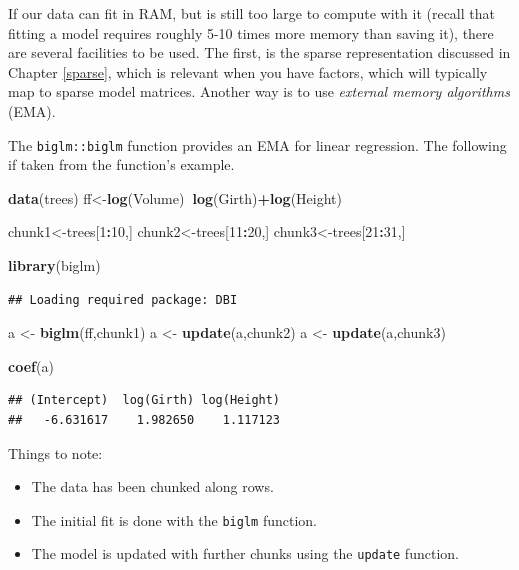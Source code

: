 \documentclass[]{book}
\newenvironment{Shaded}{\begin{snugshade}}{\end{snugshade}}
\newcommand{\DecValTok}[1]{\textcolor[rgb]{0.00,0.00,0.81}{#1}}
\newcommand{\KeywordTok}[1]{\textcolor[rgb]{0.13,0.29,0.53}{\textbf{#1}}}
\newcommand{\NormalTok}[1]{#1}
\newcommand{\OperatorTok}[1]{\textcolor[rgb]{0.81,0.36,0.00}{\textbf{#1}}}
\newcommand{\StringTok}[1]{\textcolor[rgb]{0.31,0.60,0.02}{#1}}
\providecommand{\tightlist}{%
  \setlength{\itemsep}{0pt}\setlength{\parskip}{0pt}}
\theoremstyle{definition}
\theoremstyle{definition}
\theoremstyle{definition}
\theoremstyle{remark}
\begin{document}
If our data can fit in RAM, but is still too large to compute with it (recall that fitting a model requires roughly 5-10 times more memory than saving it), there are several facilities to be used.
The first, is the sparse representation discussed in Chapter \ref{sparse}, which is relevant when you have factors, which will typically map to sparse model matrices.
Another way is to use \emph{external memory algorithms} (EMA).

The \texttt{biglm::biglm} function provides an EMA for linear regression.
The following if taken from the function's example.

\begin{Shaded}
\begin{Highlighting}[]
\KeywordTok{data}\NormalTok{(trees)}
\NormalTok{ff<-}\KeywordTok{log}\NormalTok{(Volume)}\OperatorTok{~}\KeywordTok{log}\NormalTok{(Girth)}\OperatorTok{+}\KeywordTok{log}\NormalTok{(Height)}

\NormalTok{chunk1<-trees[}\DecValTok{1}\OperatorTok{:}\DecValTok{10}\NormalTok{,]}
\NormalTok{chunk2<-trees[}\DecValTok{11}\OperatorTok{:}\DecValTok{20}\NormalTok{,]}
\NormalTok{chunk3<-trees[}\DecValTok{21}\OperatorTok{:}\DecValTok{31}\NormalTok{,]}

\KeywordTok{library}\NormalTok{(biglm)}
\end{Highlighting}
\end{Shaded}

\begin{verbatim}
## Loading required package: DBI
\end{verbatim}

\begin{Shaded}
\begin{Highlighting}[]
\NormalTok{a <-}\StringTok{ }\KeywordTok{biglm}\NormalTok{(ff,chunk1)}
\NormalTok{a <-}\StringTok{ }\KeywordTok{update}\NormalTok{(a,chunk2)}
\NormalTok{a <-}\StringTok{ }\KeywordTok{update}\NormalTok{(a,chunk3)}

\KeywordTok{coef}\NormalTok{(a)}
\end{Highlighting}
\end{Shaded}

\begin{verbatim}
## (Intercept)  log(Girth) log(Height) 
##   -6.631617    1.982650    1.117123
\end{verbatim}

Things to note:

\begin{itemize}
\tightlist
\item
  The data has been chunked along rows.
\item
  The initial fit is done with the \texttt{biglm} function.
\item
  The model is updated with further chunks using the \texttt{update} function.
\end{itemize}
\end{document}
